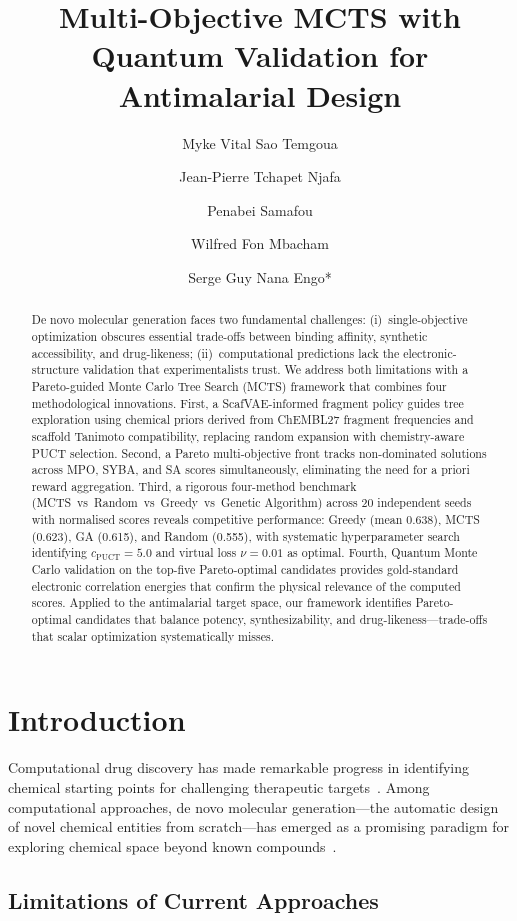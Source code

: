 \documentclass[jcim,article,layout=manuscript]{achemso}
\title{Multi-Objective MCTS with Quantum Validation for Antimalarial Design}
\author{Myke Vital Sao Temgoua}
\author{Jean-Pierre Tchapet Njafa}
\author{Penabei Samafou}
\author{Wilfred Fon Mbacham}
\author{Serge Guy Nana Engo*}
\affiliation{
  Department of Physics, Faculty of Science, University of Yaound\'{e} I,
  P.O. Box 812, Yaound\'{e}, Cameroon
}
\begin{document}
\begin{abstract}
De novo molecular generation faces two fundamental challenges: (i)~single-objective
optimization obscures essential trade-offs between binding affinity, synthetic
accessibility, and drug-likeness; (ii)~computational predictions lack the
electronic-structure validation that experimentalists trust. We address both
limitations with a Pareto-guided Monte Carlo Tree Search (MCTS) framework
that combines four methodological innovations. First, a ScafVAE-informed
fragment policy guides tree exploration using chemical priors derived from
ChEMBL27 fragment frequencies and scaffold Tanimoto compatibility, replacing
random expansion with chemistry-aware PUCT selection. Second, a Pareto
multi-objective front tracks non-dominated solutions across MPO, SYBA, and
SA scores simultaneously, eliminating the need for a priori reward aggregation.
Third, a rigorous four-method benchmark (MCTS~vs~Random~vs~Greedy~vs~Genetic
Algorithm) across 20 independent seeds with normalised scores reveals
competitive performance: Greedy (mean 0.638), MCTS (0.623), GA (0.615),
and Random (0.555), with systematic hyperparameter search identifying
$c_{\text{PUCT}}=5.0$ and virtual loss $\nu=0.01$ as optimal. Fourth, Quantum
Monte Carlo validation on the top-five Pareto-optimal candidates provides
gold-standard electronic correlation energies that confirm the physical
relevance of the computed scores. Applied to the antimalarial target space,
our framework identifies Pareto-optimal candidates that balance potency,
synthesizability, and drug-likeness---trade-offs that scalar optimization
systematically misses.
\end{abstract}

\section{Introduction}

Computational drug discovery has made remarkable progress in identifying
chemical starting points for challenging therapeutic targets~\cite{Wells2015}.
Among computational approaches, de novo molecular generation---the automatic
design of novel chemical entities from scratch---has emerged as a promising
paradigm for exploring chemical space beyond known compounds~\cite{GDPLarge2019,
Olivecrona2017, ZielStroth2020}.

\subsection{Limitations of Current Approaches}
\end{document}
